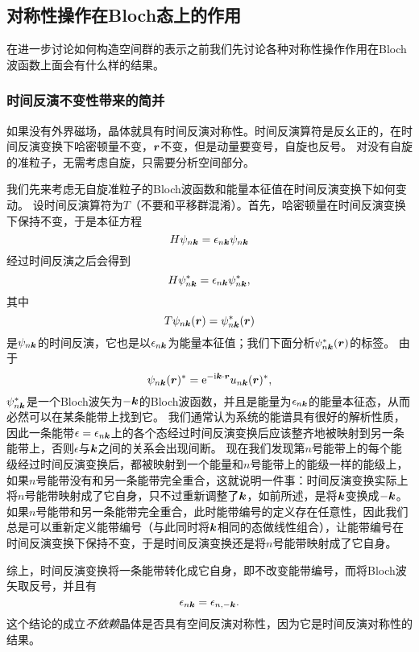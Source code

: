 \subsection{对称性操作在Bloch态上的作用}\label{sec:quasi-particle-spectrum}

在进一步讨论如何构造空间群的表示之前我们先讨论各种对称性操作作用在Bloch波函数上面会有什么样的结果。

\subsubsection{时间反演不变性带来的简并} 

如果没有外界磁场，晶体就具有时间反演对称性。时间反演算符是反幺正的，在时间反演变换下哈密顿量不变，$\vb*{r}$不变，但是动量要变号，自旋也反号。
对没有自旋的准粒子，无需考虑自旋，只需要分析空间部分。

我们先来考虑无自旋准粒子的Bloch波函数和能量本征值在时间反演变换下如何变动。
设时间反演算符为$T$（不要和平移群混淆）。首先，哈密顿量在时间反演变换下保持不变，于是本征方程
\[
    H \psi_{n \vb*{k}} = \epsilon_{n \vb*{k}} \psi_{n \vb*{k}}
\]
经过时间反演之后会得到
\[
    H \psi_{n \vb*{k}}^* = \epsilon_{n \vb*{k}} \psi_{n \vb*{k}}^*,
\]
其中
\[
    T \psi_{n \vb*{k}}(\vb*{r}) = \psi^*_{n \vb*{k}}(\vb*{r})
\]
是$\psi_{n \vb*{k}}$的时间反演，它也是以$\epsilon_{n \vb*{k}}$为能量本征值；我们下面分析$\psi^*_{n \vb*{k}}(\vb*{r})$的标签。
由于
\[
    \psi_{n \vb*{k}}(\vb*{r})^* = \mathrm{e}^{- \mathrm{i} \vb*{k} \cdot \vb*{r}} u_{n \vb*{k}}(\vb*{r})^*,
\]
$\psi_{n \vb*{k}}^*$是一个Bloch波矢为$-\vb*{k}$的Bloch波函数，并且是能量为$\epsilon_{n \vb*{k}}$的能量本征态，从而必然可以在某条能带上找到它。
我们通常认为系统的能谱具有很好的解析性质，因此一条能带$\epsilon = \epsilon_{n \vb*{k}}$上的各个态经过时间反演变换后应该整齐地被映射到另一条能带上，否则$\epsilon$与$\vb*{k}$之间的关系会出现间断。
现在我们发现第$n$号能带上的每个能级经过时间反演变换后，都被映射到一个能量和$n$号能带上的能级一样的能级上，如果$n$号能带没有和另一条能带完全重合，这就说明一件事：时间反演变换实际上将$n$号能带映射成了它自身，只不过重新调整了$\vb*{k}$，如前所述，是将$\vb*{k}$变换成$- \vb*{k}$。
如果$n$号能带和另一条能带完全重合，此时能带编号的定义存在任意性，因此我们总是可以重新定义能带编号（与此同时将$\vb*{k}$相同的态做线性组合），让能带编号在时间反演变换下保持不变，于是时间反演变换还是将$n$号能带映射成了它自身。

综上，时间反演变换将一条能带转化成它自身，即不改变能带编号，而将Bloch波矢取反号，并且有
\begin{equation}
    \epsilon_{n \vb*{k}} = \epsilon_{n, -\vb*{k}}.
    \label{eq:inverse-k-energy}
\end{equation}
这个结论的成立\emph{不依赖}晶体是否具有空间反演对称性，因为它是时间反演对称性的结果。

